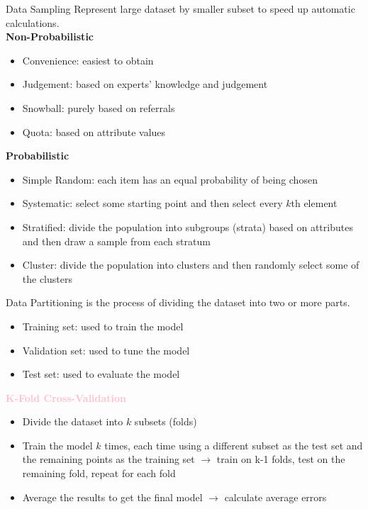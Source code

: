 \begin{definition}{Data Sampling}
    Represent large dataset by smaller subset to speed up automatic calculations.
    \vspace{1mm}\\
    \textbf{Non-Probabilistic}
    \begin{itemize}
        \item Convenience: easiest to obtain
        \item Judgement: based on experts' knowledge and judgement
        \item Snowball: purely based on referrals
        \item Quota: based on attribute values
    \end{itemize}
    \vspace{1mm}
    \textbf{Probabilistic}
    \begin{itemize}
        \item Simple Random: each item has an equal probability of being chosen
        \item Systematic: select some starting point and then select every $k$th element
        \item Stratified: divide the population into subgroups (strata) based on attributes and then draw a sample from each stratum
        \item Cluster: divide the population into clusters and then randomly select some of the clusters
    \end{itemize}
\end{definition}

\begin{definition}{Data Partitioning}
    is the process of dividing the dataset into two or more parts.
    \begin{itemize}
        \item Training set: used to train the model
        \item Validation set: used to tune the model
        \item Test set: used to evaluate the model
    \end{itemize}
    \vspace{1mm}
    \textcolor{pink}{\textbf{K-Fold Cross-Validation}}
    \begin{itemize}
        \item Divide the dataset into $k$ subsets (folds)
        \item Train the model $k$ times, each time using a different subset as the test set and the remaining points as the training set
        $\rightarrow$ train on k-1 folds, test on the remaining fold, repeat for each fold
        \item Average the results to get the final model $\rightarrow$ calculate average errors
    \end{itemize}
\end{definition}


